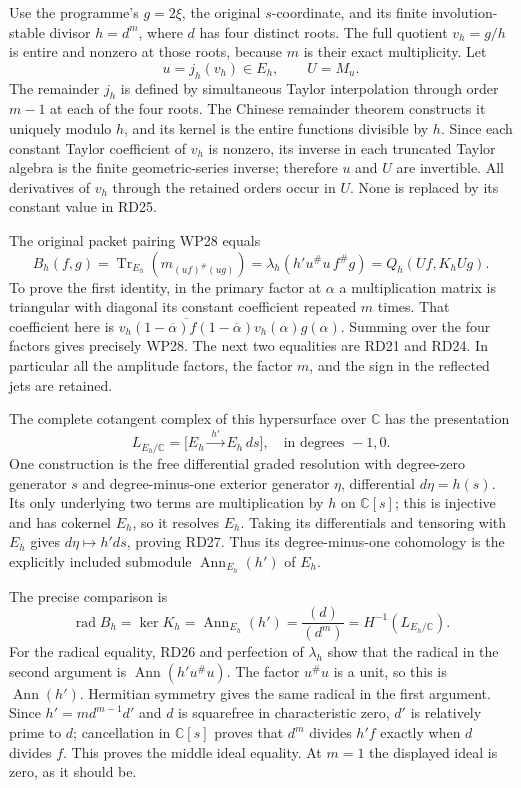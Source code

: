 \documentclass[
  10pt,
  a4paper,
]{article}
\begin{document}
Use the programme's \(g=2\xi\), the original \(s\)-coordinate, and its
finite involution-stable divisor \(h=d^m\), where \(d\) has four
distinct roots. The full quotient \(v_h=g/h\) is entire and nonzero at
those roots, because \(m\) is their exact multiplicity. Let \[
u=j_h(v_h)\in E_h,\qquad U=M_u.
\tag{RD25}
\] The remainder \(j_h\) is defined by simultaneous Taylor interpolation
through order \(m-1\) at each of the four roots. The Chinese remainder
theorem constructs it uniquely modulo \(h\), and its kernel is the
entire functions divisible by \(h\). Since each constant Taylor
coefficient of \(v_h\) is nonzero, its inverse in each truncated Taylor
algebra is the finite geometric-series inverse; therefore \(u\) and
\(U\) are invertible. All derivatives of \(v_h\) through the retained
orders occur in \(U\). None is replaced by its constant value in RD25.

The original packet pairing WP28 equals \[
B_h(f,g)=\operatorname{Tr}_{E_h}(m_{(uf)^\#(ug)})
=\lambda_h(h'u^\#u\,f^\#g)
=Q_h(Uf,K_hUg).
\tag{RD26}
\] To prove the first identity, in the primary factor at \(\alpha\) a
multiplication matrix is triangular with diagonal its constant
coefficient repeated \(m\) times. That coefficient here is
\(\overline{v_h(1-\overline\alpha)f(1-\overline\alpha)}v_h(\alpha)g(\alpha)\).
Summing over the four factors gives precisely WP28. The next two
equalities are RD21 and RD24. In particular all the amplitude factors,
the factor \(m\), and the sign in the reflected jets are retained.

The complete cotangent complex of this hypersurface over \(\mathbb C\)
has the presentation \[
L_{E_h/\mathbb C}=
\bigl[E_h\xrightarrow{\;h'\;}E_h\,ds\bigr],
\quad\text{in degrees }-1,0.
\tag{RD27}
\] One construction is the free differential graded resolution with
degree-zero generator \(s\) and degree-minus-one exterior generator
\(\eta\), differential \(d\eta=h(s)\). Its only underlying two terms are
multiplication by \(h\) on \(\mathbb C[s]\); this is injective and has
cokernel \(E_h\), so it resolves \(E_h\). Taking its differentials and
tensoring with \(E_h\) gives \(d\eta\mapsto h'ds\), proving RD27. Thus
its degree-minus-one cohomology is the explicitly included submodule
\(\operatorname{Ann}_{E_h}(h')\) of \(E_h\).

The precise comparison is \[
\operatorname{rad}B_h=\ker K_h
=\operatorname{Ann}_{E_h}(h')
=\frac{(d)}{(d^m)}
=H^{-1}(L_{E_h/\mathbb C}).
\tag{RD28}
\] For the radical equality, RD26 and perfection of \(\lambda_h\) show
that the radical in the second argument is
\(\operatorname{Ann}(h'u^\#u)\). The factor \(u^\#u\) is a unit, so this
is \(\operatorname{Ann}(h')\). Hermitian symmetry gives the same radical
in the first argument. Since \(h'=m d^{m-1}d'\) and \(d\) is squarefree
in characteristic zero, \(d'\) is relatively prime to \(d\);
cancellation in \(\mathbb C[s]\) proves that \(d^m\) divides \(h'f\)
exactly when \(d\) divides \(f\). This proves the middle ideal equality.
At \(m=1\) the displayed ideal is zero, as it should be.
\end{document}
